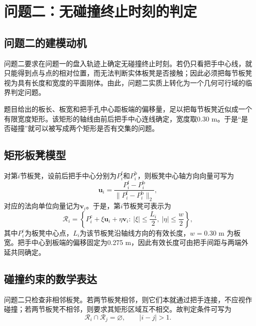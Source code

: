 \section{问题二：无碰撞终止时刻的判定}
\subsection{问题二的建模动机}
问题二要求在问题一的盘入轨迹上确定无碰撞终止时刻。若仍只看把手中心线，就只能得到点与点的相对位置，而无法判断实体板凳是否接触；因此必须把每节板凳视为具有长度和宽度的平面刚体。由此，问题二实质上转化为一个几何可行域的临界判定问题。

题目给出的板长、板宽和把手孔中心距板端的偏移量，足以把每节板凳近似成一个有限宽度矩形。该矩形的轴线由前后把手中心连线确定，宽度取0.30 m。于是“是否碰撞”就可以被写成两个矩形是否有交集的问题。

\subsection{矩形板凳模型}
对第$i$节板凳，设前后把手中心分别为$P_i^{\mathrm{f}}$和$P_i^{\mathrm{b}}$，则板凳中心轴方向向量可写为
\[
\bm{u}_i=\frac{P_i^{\mathrm{f}}-P_i^{\mathrm{b}}}{\|P_i^{\mathrm{f}}-P_i^{\mathrm{b}}\|_2},
\]
对应的法向单位向量记为$\bm{v}_i$。于是，第$i$节板凳可表示为
\[
\mathcal{R}_i=\left\{P_i^{\mathrm{c}}+\xi \bm{u}_i+\eta \bm{v}_i:
\ |\xi|\le \frac{L_i}{2},\ |\eta|\le \frac{w}{2}\right\},
\]
其中$P_i^{\mathrm{c}}$为板凳中心点，$L_i$为该节板凳沿轴线方向的有效长度，$w=0.30$ m 为板宽。把手中心到板端的偏移固定为0.275 m，因此有效长度可由把手间距与两端外延共同确定。

\subsection{碰撞约束的数学表达}
问题二只检查非相邻板凳。若两节板凳相邻，则它们本就通过把手连接，不应视作碰撞；若两节板凳不相邻，则要求其矩形区域互不相交。故判定条件可写为
\[
\mathcal{R}_i\cap \mathcal{R}_j=\varnothing,\qquad |i-j|>1.
\]

